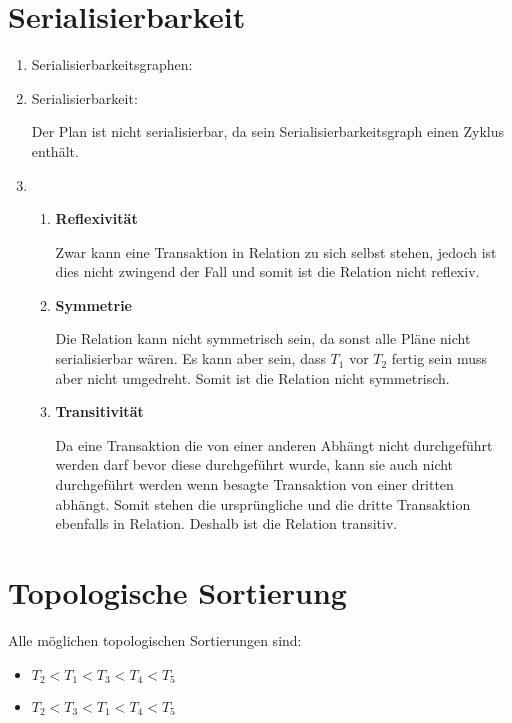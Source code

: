 \documentclass{scrartcl}
\begin{document}
\section{Serialisierbarkeit}
\begin{enumerate}
    \item Serialisierbarkeitsgraphen:
    \begin{center}
    \end{center}
    \item Serialisierbarkeit:
    
    Der Plan ist nicht serialisierbar, da sein Serialisierbarkeitsgraph einen Zyklus enthält.
    \item 
    \begin{enumerate}
        \item \textbf{Reflexivität}
        
        Zwar kann eine Transaktion in Relation zu sich selbst stehen, jedoch ist dies nicht zwingend der Fall und somit ist die Relation nicht reflexiv.
        \item \textbf{Symmetrie}
        
        Die Relation kann nicht symmetrisch sein, da sonst alle Pläne nicht serialisierbar wären. Es kann aber sein, dass $T_1$ vor $T_2$ fertig sein muss aber nicht umgedreht. Somit ist die Relation nicht symmetrisch.
        \item \textbf{Transitivität}
        
        Da eine Transaktion die von einer anderen Abhängt nicht durchgeführt werden darf bevor diese durchgeführt wurde, kann sie auch nicht durchgeführt werden wenn besagte Transaktion von einer dritten abhängt. Somit stehen die ursprüngliche und die dritte Transaktion ebenfalls in Relation. Deshalb ist die Relation transitiv.
    \end{enumerate}
\end{enumerate}
\section{Topologische Sortierung}
Alle möglichen topologischen Sortierungen sind:
\begin{itemize}
    \item $T_2<T_1<T_3<T_4<T_5$
    \item $T_2<T_3<T_1<T_4<T_5$
\end{itemize}
\end{document}
